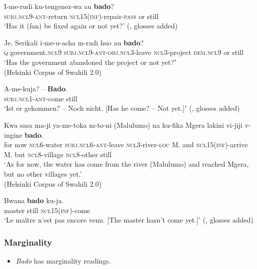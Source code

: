 \begin{exe}
	\ex\label{exAppendixswahiliNotYet1}
	\gll I-me-rudi ku-tengenez-wa au \textbf{bado}?\\
	\textsc{subj}.\textsc{ncl}9-\textsc{ant}-return \textsc{ncl}15(\textsc{inf})-repair-\textsc{pass} or still\\
	\glt \lq Has it (fan) be fixed again or not yet?\rq{ }(\cite[392]{Ashton1947}, glosses added)
	
	\ex\label{exAppendixswahiliNotYet2}
	\gll Je, Serikali i-me-u-acha m-radi huo au \textbf{bado}?\\
	\textsc{q} government.\textsc{ncl}9 \textsc{subj}.\textsc{ncl}9-\textsc{ant}-\textsc{obj}.\textsc{ncl}3-leave \textsc{ncl}3-project \textsc{dem}.\textsc{ncl}9 or still\\
	\glt \lq Has the government abandoned the project or not yet?ʼ
	\\(Helsinki Corpus of Swahili 2.0)

	\ex\label{exAppendixswahiliNotYet3}
	\gll A-me-kuja? – \textbf{Bado}.\\
	\textsc{subj}.\textsc{ncl}1-\textsc{ant}-come {} still\\
	\glt \lq Ist er gekommen? -- Noch nicht. [Has he come? -- Not yet.]ʼ (\cite[15]{Schadeberg1990}, glosses added)
	
	\ex\label{exAppendixswahiliNotYet4}
	\gll Kwa sasa ma-ji ya-me-toka m-to-ni (Malulumo) na ku-fika Mgera lakini vi-jiji v-ingine \textbf{bado}.\\
	for now \textsc{ncl}6-water \textsc{subj}.\textsc{ncl}6-\textsc{ant}-leave \textsc{ncl3}-river-\textsc{loc} \phantom{(}M. and \textsc{ncl}15(\textsc{inf})-arrive M. but \textsc{ncl}8-village \textsc{ncl}8-other still\\
	\glt \lq As for now, the water has come from the river (Malulumo) and reached Mgera, but no other villages yet.’
	\\(Helsinki Corpus of Swahili 2.0)
	
	\ex\label{exAppendixswahiliNotYet5}
	\gll Bwana \textbf{bado} ku-ja.\\
	master still \textsc{ncl}15(\textsc{inf})-come\\
	\glt \lq Le maître n’est pas encore venu. [The master hasn't come yet.]' (\cite[85]{Sacleux19391941}, glosses added)
\end{exe}

\subsubsection{Marginality}
\label{appendixSwahiliMarginal}
\begin{itemize}
	\item \textit{Bado} has marginality readings.
\end{itemize}

